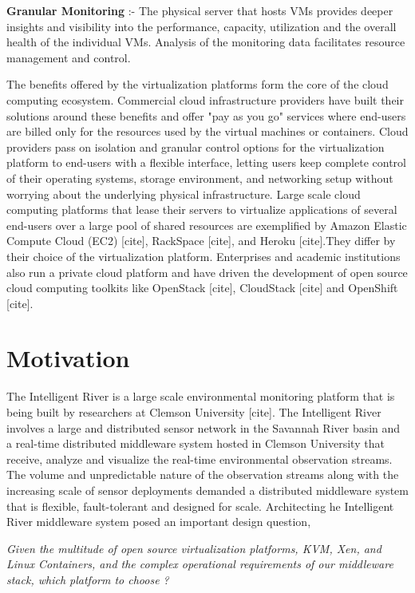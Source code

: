     \textbf{Granular Monitoring} :- The physical server that hosts VMs provides deeper insights and visibility into the performance, capacity, utilization and the overall health of the individual VMs. Analysis of the monitoring data facilitates resource management and control.

The benefits offered by the virtualization platforms form the core of the cloud computing ecosystem. Commercial cloud infrastructure providers have built their solutions around these benefits and offer "pay as you go" services where end-users are billed only for the resources used by the virtual machines or containers. Cloud providers pass on isolation and granular control options for the virtualization platform to end-users with a flexible interface, letting users keep complete control of their operating systems, storage environment, and networking setup without worrying about the underlying physical infrastructure. Large scale cloud computing platforms that lease their servers to virtualize applications of several end-users over a large pool of shared resources are exemplified by Amazon Elastic Compute Cloud (EC2) [cite], RackSpace [cite], and Heroku [cite].They differ by their choice of the virtualization platform. Enterprises and academic institutions also run a private cloud platform and have driven the development of open source cloud computing toolkits like OpenStack [cite], CloudStack [cite] and OpenShift [cite]. 

\section{Motivation}

The Intelligent River\textsuperscript{\textregistered} is a large scale environmental monitoring platform that is being built by researchers at Clemson University [cite]. The Intelligent River\textsuperscript{\textregistered} involves a large and distributed sensor network in the Savannah River basin and a real-time distributed middleware system hosted in Clemson University that receive, analyze and visualize the real-time environmental observation streams. The volume and unpredictable nature of the observation streams along with the increasing scale of sensor deployments demanded a distributed middleware system that is flexible, fault-tolerant and designed for scale. Architecting he Intelligent River\textsuperscript{\textregistered} middleware system posed an important design question,


\emph{Given the multitude of open source virtualization platforms, KVM, Xen, and Linux Containers, and the complex operational requirements of our middleware stack, which platform to choose ?}


